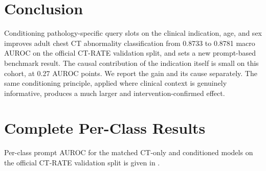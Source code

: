 \documentclass[10pt,twocolumn]{article}
\begin{document}
\section{Conclusion}
Conditioning pathology-specific query slots on the clinical indication, age,
and sex improves adult chest CT abnormality classification from 0.8733 to
0.8781 macro AUROC on the official CT-RATE validation split, and sets a new
prompt-based benchmark result. The causal contribution of the indication
itself is small on this cohort, at 0.27 AUROC points. We report the
gain and its cause separately. The same conditioning principle, applied where clinical
context is genuinely informative, produces a much larger and
intervention-confirmed effect.

\appendix
\section{Complete Per-Class Results}
Per-class prompt AUROC for the matched CT-only and conditioned models on the
official CT-RATE validation split is given in .

\begin{table}[t]
\centering
\caption{Adult CT-RATE per-class prompt AUROC, averaged over three seeds.}
\label{tab:adultclass}
\end{table}
\end{document}
